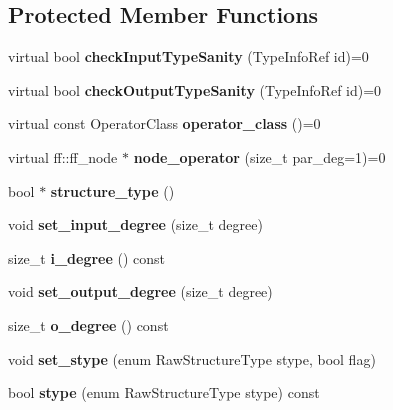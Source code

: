 \subsection*{\-Protected \-Member \-Functions}
\begin{DoxyCompactItemize}
\item 
\hypertarget{class_operator_a6af729a9d00cab0f62cf0e3de2548d39}{virtual bool {\bfseries check\-Input\-Type\-Sanity} (\-Type\-Info\-Ref id)=0}\label{class_operator_a6af729a9d00cab0f62cf0e3de2548d39}

\item 
\hypertarget{class_operator_aeacd17ae40fc541ee6a960ee45e405e6}{virtual bool {\bfseries check\-Output\-Type\-Sanity} (\-Type\-Info\-Ref id)=0}\label{class_operator_aeacd17ae40fc541ee6a960ee45e405e6}

\item 
\hypertarget{class_operator_a5b7ccb315884468f1683e83b3539f400}{virtual const \-Operator\-Class {\bfseries operator\-\_\-class} ()=0}\label{class_operator_a5b7ccb315884468f1683e83b3539f400}

\item 
\hypertarget{class_operator_a7753ef26769c0aa9ab986d51e7d76339}{virtual ff\-::ff\-\_\-node $\ast$ {\bfseries node\-\_\-operator} (size\-\_\-t par\-\_\-deg=1)=0}\label{class_operator_a7753ef26769c0aa9ab986d51e7d76339}

\item 
\hypertarget{class_operator_a2f0f76f195ffd9ee8f1fce2da7956926}{bool $\ast$ {\bfseries structure\-\_\-type} ()}\label{class_operator_a2f0f76f195ffd9ee8f1fce2da7956926}

\item 
\hypertarget{class_operator_a220b5efebda50b93c7fb29d997a12413}{void {\bfseries set\-\_\-input\-\_\-degree} (size\-\_\-t degree)}\label{class_operator_a220b5efebda50b93c7fb29d997a12413}

\item 
\hypertarget{class_operator_a49dbe907baab7d9d5ae44c96074fe873}{size\-\_\-t {\bfseries i\-\_\-degree} () const }\label{class_operator_a49dbe907baab7d9d5ae44c96074fe873}

\item 
\hypertarget{class_operator_a398b346d10ab14d3cb80e5b600219ff9}{void {\bfseries set\-\_\-output\-\_\-degree} (size\-\_\-t degree)}\label{class_operator_a398b346d10ab14d3cb80e5b600219ff9}

\item 
\hypertarget{class_operator_a8f4deb310b1665ae300aa3389d7b58b6}{size\-\_\-t {\bfseries o\-\_\-degree} () const }\label{class_operator_a8f4deb310b1665ae300aa3389d7b58b6}

\item 
\hypertarget{class_operator_aa690c335fa31d9b85f9c2e6271a0b018}{void {\bfseries set\-\_\-stype} (enum \-Raw\-Structure\-Type stype, bool flag)}\label{class_operator_aa690c335fa31d9b85f9c2e6271a0b018}

\item 
\hypertarget{class_operator_a910957044131a074f4fa7be8577a900a}{bool {\bfseries stype} (enum \-Raw\-Structure\-Type stype) const }\label{class_operator_a910957044131a074f4fa7be8577a900a}

\end{DoxyCompactItemize}

